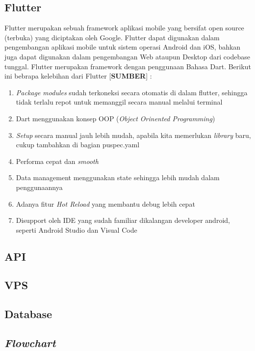 \begin{flushleft}
\begin{justify}
        \subsection{Flutter}
        Flutter merupakan sebuah framework aplikasi mobile yang bersifat open source (terbuka) yang diciptakan oleh Google. Flutter dapat digunakan dalam pengembangan aplikasi mobile untuk sistem operasi Android dan iOS, bahkan juga dapat digunakan dalam pengembangan Web ataupun Desktop dari codebase tunggal. Flutter merupakan framework dengan penggunaan Bahasa Dart.
Berikut ini bebrapa kelebihan dari Flutter [\textbf{SUMBER}] :
\begin{enumerate}
    \item \textit{Package modules} sudah terkoneksi secara otomatis di dalam flutter, sehingga tidak terlalu repot untuk memanggil secara manual melalui terminal
    \item Dart menggunakan konsep OOP (\textit{Object Orinented Programming})
    \item \textit{Setup} secara manual jauh lebih mudah, apabila kita memerlukan \textit{library} baru, cukup tambahkan di bagian puspec.yaml
    \item Performa cepat dan  \textit{smooth}
    \item Data management menggunakan state sehingga lebih mudah dalam penggunaannya
    \item Adanya fitur \textit{Hot Reload} yang membantu debug lebih cepat
    \item Disupport oleh IDE yang sudah familiar dikalangan developer android, seperti Android Studio dan Visual Code\\
    
\end{enumerate}


        \subsection{API}

        \subsection{VPS}

        \subsection{Database}

        \subsection{\textit{Flowchart}}


\end{justify}
\end{flushleft}
